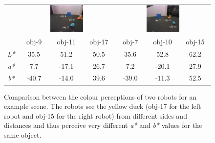 \begin{figure}[htbp]
  \centering\small
  \begin{tabular}{c|ccc|ccc}
    \multicolumn{1}{c}{}
    & \multicolumn{3}{c}{\includegraphics[width=0.37\textwidth]{./experiments/figures/grounding-scene-a}}
    & \multicolumn{3}{c}{\includegraphics[width=0.37\textwidth]{./experiments/figures/grounding-scene-b}} \\
    & obj-9 & obj-11 & obj-17 & obj-7 & obj-10 & obj-15 \\
    \hline
    \emph{L*} & 35.5 & 51.2 & 50.5 & 35.6 & 52.8 & 62.2 \\
    \emph{a*} & 7.7 & -17.1 & 26.7 & 7.2 & -20.1 & 27.9 \\
    \emph{b*} & -40.7 & -14.0 & 39.6 & -39.0 & -11.3 & 52.5 \\
    \hline
  \end{tabular}
  \caption[Comparison between the colour perceptions of two robots for
  an example scene]{Comparison between the colour perceptions of two
    robots for an example scene. The robots see the yellow duck
    (obj-17 for the left robot and obj-15 for the right robot) from
    different sides and distances and thus perceive very different
    \emph{a*} and \emph{b*} values for the same object.}
  \label{f:scene-example}
\end{figure}

